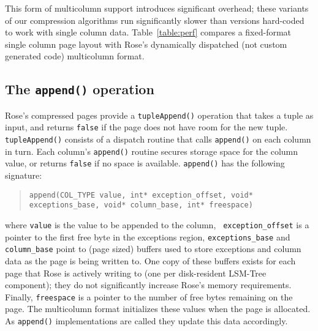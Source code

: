 \documentclass{vldb}
\newcommand{\rows}{Rose\xspace}
\newcommand{\rowss}{Rose's\xspace}
\begin{document}
This form of multicolumn support introduces significant overhead;
these variants of our compression algorithms run significantly slower
than versions hard-coded to work with single column data.
Table~\ref{table:perf} compares a fixed-format single column page
layout with \rowss dynamically dispatched (not custom generated code)
multicolumn format.


\subsection{The {\tt \large append()} operation}

\rowss compressed pages provide a {\tt tupleAppend()} operation that
takes a tuple as input, and returns {\tt false} if the page does not have
room for the new tuple.  {\tt tupleAppend()} consists of a dispatch
routine that calls {\tt append()} on each column in turn.  Each
column's {\tt append()} routine secures storage space for the column
value, or returns {\tt false} if no space is available.  {\tt append()} has the
following signature:
\begin{quote}
  {\tt append(COL\_TYPE value, int* exception\_offset,
       void* exceptions\_base, void* column\_base, int* freespace) }
\end{quote}
where {\tt value} is the value to be appended to the column, {\tt
  exception\_offset} is a pointer to the first free byte in the
exceptions region, {\tt exceptions\_base} and {\tt column\_base} point
to (page sized) buffers used to store exceptions and column data as
the page is being written to.  One copy of these buffers exists for
each page that \rows is actively writing to (one per disk-resident
LSM-Tree component); they do not significantly increase \rowss memory
requirements.  Finally, {\tt freespace} is a pointer to the number of
free bytes remaining on the page.  The multicolumn format initializes
these values when the page is allocated.  As {\tt append()}
implementations are called they update this data accordingly.


\end{document}
